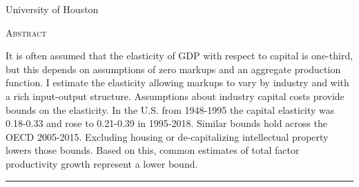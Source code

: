 \documentclass[11pt]{article}
\begin{document}
\begin{titlepage}
\vspace{2in} \noindent {\large \today}

\vspace{.5in} 

\vspace{.25in} 

\vspace{.05in} \noindent University of Houston

\vfill \noindent \textsc{Abstract} \hrulefill

\vspace{.05in} \noindent It is often assumed that the elasticity of GDP with respect to capital is one-third, but this depends on assumptions of zero markups and an aggregate production function. I estimate the elasticity allowing markups to vary by industry and with a rich input-output structure. Assumptions about industry capital costs provide bounds on the elasticity. In the U.S. from 1948-1995 the capital elasticity was 0.18-0.33 and rose to 0.21-0.39 in 1995-2018. Similar bounds hold across the OECD 2005-2015. Excluding housing or de-capitalizing intellectual property lowers those bounds. Based on this, common estimates of total factor productivity growth represent a lower bound. 

\vspace{.1in} \hrule

\vspace{.5in} 

\vspace{.1in} 

\vspace{.1in} 
\end{titlepage}

\pagebreak 
\end{document}
